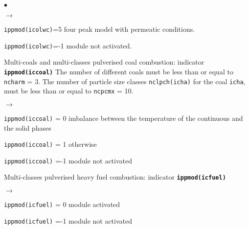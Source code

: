 {{{\begin{list}{$\bullet$}{}
\begin{list}{$\rightarrow$}{}
               \item \texttt{ippmod(icolwc)}=5 four peak model with permeatic conditions.
               \item \texttt{ippmod(icolwc)}=-1 module not activated.
          \end{list}
        \item Multi-coals and multi-classes pulverised coal combustion:
              indicator {\bf \tt ippmod(iccoal)}
              The number of different coals must be less than or equal to
              \texttt{ncharm} = 3. The number of particle size
             classes \texttt{nclpch(icha)} for the coal
             \texttt{icha}, must
             be less than or equal to \texttt{ncpcmx} = 10.
         \begin{list}{$\rightarrow$}{}
                \item \texttt{ippmod(iccoal)} = 0 imbalance between the
                      temperature of the continuous and the solid phases
                \item \texttt{ippmod(iccoal)} = 1 otherwise
                \item \texttt{ippmod(iccoal)} =-1 module not activated
         \end{list}

        \item Multi-classes pulverised heavy fuel combustion:
              indicator {\bf \tt ippmod(icfuel)}
         \begin{list}{$\rightarrow$}{}
                \item \texttt{ippmod(icfuel)} = 0 module activated
                \item \texttt{ippmod(icfuel)} =-1 module not activated
         \end{list}


\end{list}}}}
